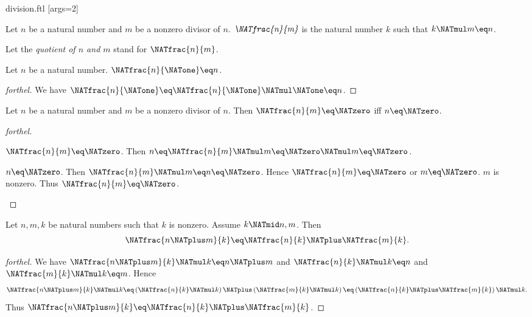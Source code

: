 \documentclass{naproche-library}
\begin{document}
\begin{smodule}[title=Division]{division.ftl}
[args=2]{}


\begin{definition}[forthel,id=ARITHMETIC_14_2313654268297915]
  Let $n$ be a natural number and $m$ be a nonzero divisor of $n$.
  $\emph{\NATfrac{n}{m}}$ is the natural number $k$ such that $k \NATmul m \eq n$.

  Let the \emph{quotient of $n$ and $m$} stand for $\NATfrac{n}{m}$.
\end{definition}

\begin{proposition}[forthel,id=ARITHMETIC_14_0843793254698710]
  Let $n$ be a natural number.
  $\NATfrac{n}{\NATone} \eq n$.
\end{proposition}
\begin{proof}[forthel]
  We have $\NATfrac{n}{\NATone}
    \eq \NATfrac{n}{\NATone} \NATmul \NATone
    \eq n$.
\end{proof}

\begin{proposition}[forthel,id=ARITHMETIC_14_1254235698632545]
  Let $n$ be a natural number and $m$ be a nonzero divisor of $n$.
  Then $\NATfrac{n}{m} \eq \NATzero$ iff $n \eq \NATzero$.
\end{proposition}
\begin{proof}[forthel]
  \begin{case}{$\NATfrac{n}{m} \eq \NATzero$.}
    Then $n
      \eq \NATfrac{n}{m} \NATmul m
      \eq \NATzero \NATmul m
      \eq \NATzero$.
  \end{case}

  \begin{case}{$n \eq \NATzero$.}
    Then $\NATfrac{n}{m} \NATmul m
      \eq n
      \eq \NATzero$.
    Hence $\NATfrac{n}{m} \eq \NATzero$ or $m \eq \NATzero$.
    $m$ is nonzero.
    Thus $\NATfrac{n}{m} \eq \NATzero$.
  \end{case}
\end{proof}

\begin{proposition}[forthel,id=ARITHMETIC_14_5137961454123875]
  Let $n, m, k$ be natural numbers such that $k$ is nonzero.
  Assume $k \NATmid n,m$.
  Then \[\NATfrac{n \NATplus m}{k} \eq \NATfrac{n}{k} \NATplus \NATfrac{m}{k}.\]
\end{proposition}
\begin{proof}[forthel]
  We have $\NATfrac{n \NATplus m}{k} \NATmul k \eq n \NATplus m$ and $\NATfrac{n}{k} \NATmul k \eq n$ and $\NATfrac{m}{k} \NATmul k \eq m$.
  Hence
  \[  \NATfrac{n \NATplus m}{k} \NATmul k
      \eq \left( \NATfrac{n}{k} \NATmul k \right) \NATplus \left( \NATfrac{m}{k} \NATmul k \right)
      \eq \left( \NATfrac{n}{k} \NATplus \NATfrac{m}{k} \right) \NATmul k. \]
  Thus $\NATfrac{n \NATplus m}{k} \eq \NATfrac{n}{k} \NATplus \NATfrac{m}{k}$.
\end{proof}


\end{smodule}
\end{document}
